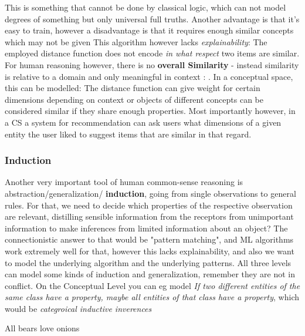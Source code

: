 This is something that cannot be done by classical logic, which can not model degrees of something but only universal full truths. Another advantage is that it's easy to train, however a disadvantage is that it requires enough similar concepts which may not be given This algorithm however lacks \textit{explainability}: The employed distance function does not encode \textit{in what respect} two items are similar. For human reasoning however, there is no \textbf{overall Similarity} - instead similarity is relative to a domain and only meaningful in context \cite{Goodman1972-GOOPAP-3}:  \cite[110]{Gardenfors2000a}. In a conceptual space, this can be modelled: The distance function can give weight for certain dimensions depending on context or objects of different concepts can be considered similar if they share enough properties. Most importantly however, in a CS a system for recommendation can ask users what dimensions of a given entity the user liked to suggest items that are similar in that regard.

\subsubsection*{Induction}

Another very important tool of human common-sense reasoning is abstraction/generalization/ \textbf{induction}, going from single observations to general rules. For that, we need to decide which properties of the respective observation are relevant, distilling sensible information from the receptors from unimportant information to make inferences from limited information about an object? The connectionistic answer to that would be "pattern matching", and ML algorithms work extremely well for that, however this lacks explainability, and also we want to model the underlying algorithm and the underlying patterns. All three levels can model some kinds of induction and generalization, remember they are not in conflict. On the Conceptual Level you can eg model \textit{If two different entities of the same class have a property, maybe all entities of that class have a property}, which would be \textit{categroical inductive inverences}

{All bears love onions \cite[226]{Gardenfors2000a}}

